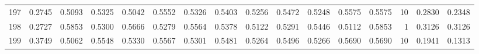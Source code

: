 \begin{tabular}{lrrrrrrrrrrrrrrr}
197 &      0.2745 &  0.5093 &  0.5325 &  0.5042 &  0.5552 &  0.5326 &  0.5403 &  0.5256 &  0.5472 &  0.5248 &   0.5575 &     0.5575 &     10 &                    0.2830 &                     0.2348 \\
198 &      0.2727 &  0.5853 &  0.5300 &  0.5666 &  0.5279 &  0.5564 &  0.5378 &  0.5122 &  0.5291 &  0.5446 &   0.5112 &     0.5853 &      1 &                    0.3126 &                     0.3126 \\
199 &      0.3749 &  0.5062 &  0.5548 &  0.5330 &  0.5567 &  0.5301 &  0.5481 &  0.5264 &  0.5496 &  0.5266 &   0.5690 &     0.5690 &     10 &                    0.1941 &                     0.1313 \\
\bottomrule
\end{tabular}

